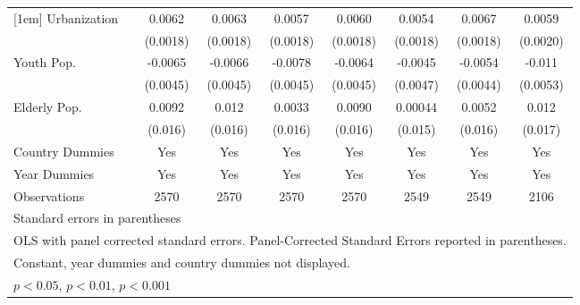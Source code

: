 \begin{table}[htbp]
\begin{tabular}{l*{7}{c}}
[1em]
Urbanization           &      0.0062\sym{***}&      0.0063\sym{***}&      0.0057\sym{**} &      0.0060\sym{***}&      0.0054\sym{**} &      0.0067\sym{***}&      0.0059\sym{**} \\
                    &    (0.0018)         &    (0.0018)         &    (0.0018)         &    (0.0018)         &    (0.0018)         &    (0.0018)         &    (0.0020)         \\
[1em]
Youth Pop.           &     -0.0065         &     -0.0066         &     -0.0078         &     -0.0064         &     -0.0045         &     -0.0054         &      -0.011\sym{*}  \\
                    &    (0.0045)         &    (0.0045)         &    (0.0045)         &    (0.0045)         &    (0.0047)         &    (0.0044)         &    (0.0053)         \\
[1em]
Elderly Pop.           &      0.0092         &       0.012         &      0.0033         &      0.0090         &     0.00044         &      0.0052         &       0.012         \\
                    &     (0.016)         &     (0.016)         &     (0.016)         &     (0.016)         &     (0.015)         &     (0.016)         &     (0.017)         \\
[1em]
Country Dummies     &         Yes         &         Yes         &         Yes         &         Yes         &         Yes         &         Yes         &         Yes         \\
[1em]
Year Dummies        &         Yes         &         Yes         &         Yes         &         Yes         &         Yes         &         Yes         &         Yes         \\
\hline
Observations        &        2570         &        2570         &        2570         &        2570         &        2549         &        2549         &        2106         \\
\hline\hline
\multicolumn{8}{l}{\footnotesize Standard errors in parentheses}\\
\multicolumn{8}{l}{\footnotesize OLS with panel corrected standard errors. Panel-Corrected Standard Errors reported in parentheses.}\\
\multicolumn{8}{l}{\footnotesize Constant, year dummies and country dummies not displayed.}\\
\multicolumn{8}{l}{\footnotesize \sym{*} \(p<0.05\), \sym{**} \(p<0.01\), \sym{***} \(p<0.001\)}\\
\end{tabular}
\end{table}
